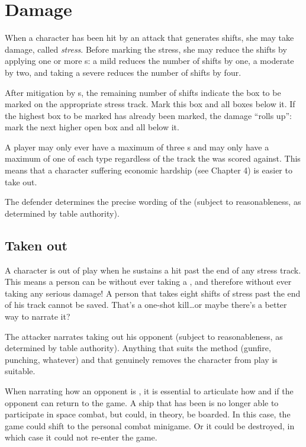 \section{Damage}\label{sec:personal-combat-damage}

When a character has been hit by an attack that generates shifts, she may take damage, called \emph{stress}. Before marking the stress, she may reduce the shifts by applying one or more \Consequence{}s: a mild \Consequence{} reduces the number of shifts by one, a moderate \Consequence{} by two, and taking a severe \Consequence{} reduces the number of shifts by four.

After mitigation by \Consequence{}s, the remaining number of shifts indicate the box to be marked on the appropriate stress track. Mark this box and all boxes below it. If the highest box to be marked has already been marked, the damage ``rolls up'': mark the next higher open box and all below it.

A player may only ever have a maximum of three \Consequence{}s and may only have a maximum of one of each type regardless of the track the \Consequence{} was scored against. This means that a character suffering economic hardship (see Chapter 4) is easier to take out.

The defender determines the precise wording of the \Consequence{} (subject to reasonableness, as determined by table authority).

\subsection{Taken out}
\label{sec:personal-combat-taken-out}

A character is out of play when he sustains a hit past the end of any stress track. This means a person can be \TakenOut{} without ever taking a \Consequence{}, and therefore without ever taking any serious damage! A person that takes eight shifts of stress past the end of his \Health{} track cannot be saved. That's a one-shot kill\ldots or maybe there's a better way to narrate it?

The attacker narrates taking out his opponent (subject to reasonableness, as determined by table authority). Anything that suits the method (gunfire, punching, whatever) and that genuinely removes the character from play is suitable.

When narrating how an opponent is \TakenOut{}, it is essential to articulate how and if the opponent can return to the game. A ship that has been \TakenOut{} is no longer able to participate in space combat, but could, in theory, be boarded. In this case, the game could shift to the personal combat minigame. Or it could be destroyed, in which case it could not re-enter the game.

